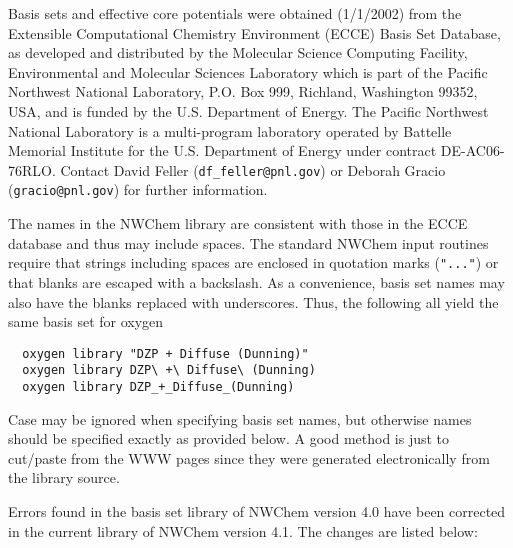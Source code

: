 %
%
\label{sec:knownbasis}

Basis sets and effective core potentials were obtained (1/1/2002) from
the Extensible Computational Chemistry Environment (ECCE) Basis Set
Database, as developed and distributed by the Molecular Science
Computing Facility, Environmental and Molecular Sciences Laboratory
which is part of the Pacific Northwest National Laboratory, P.O. Box
999, Richland, Washington 99352, USA, and is funded by the
U.S. Department of Energy.  The Pacific Northwest National Laboratory
is a multi-program laboratory operated by Battelle Memorial Institute
for the U.S. Department of Energy under contract DE-AC06-76RLO.
Contact David Feller (\verb+df_feller@pnl.gov+) or Deborah Gracio
(\verb+gracio@pnl.gov+) for further information.

The names in the NWChem library are consistent with those in the ECCE
database and thus may include spaces.  The standard NWChem input
routines require that strings including spaces are enclosed in
quotation marks (\verb+"..."+) or that blanks are escaped with a
backslash.  As a convenience, basis set names may also have the blanks
replaced with underscores.  Thus, the following all yield the same
basis set for oxygen
\begin{verbatim}
  oxygen library "DZP + Diffuse (Dunning)"
  oxygen library DZP\ +\ Diffuse\ (Dunning)
  oxygen library DZP_+_Diffuse_(Dunning)
\end{verbatim}

Case may be ignored when specifying basis set names, but otherwise
names should be specified exactly as provided below.  A good method is
just to cut/paste from the WWW pages since they were generated
electronically from the library source.

Errors found in the basis set library of NWChem version 4.0 have been corrected in 
the current library of NWChem version 4.1. The changes are listed below:

